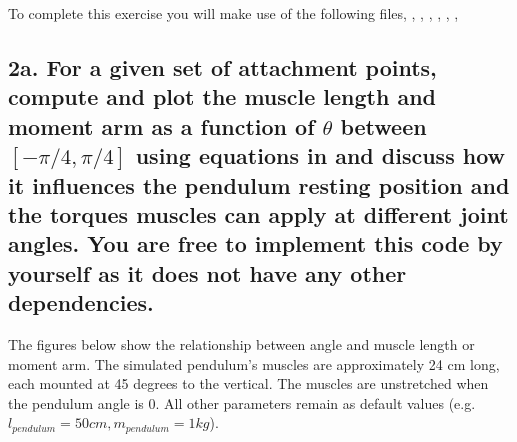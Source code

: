 \documentclass{cmc}
\begin{document}
To complete this exercise you will make use of the following files,
, ,
, , ,
,  %

\label{sec:questions}

\subsection*{2a. For a given set of attachment points, compute and
  plot the muscle length and moment arm as a function of $\theta$
  between $[-\pi/4, \pi/4]$ using equations in 
  and discuss how it influences the pendulum resting position and the
  torques muscles can apply at different joint angles. You are free to implement
this code by yourself as it does not have any other dependencies.}
\label{sec:2a}

The figures below show the relationship between angle and muscle length or moment arm. The simulated pendulum's muscles are approximately 24 cm long, each mounted at 45 degrees to the vertical. The muscles are unstretched when the pendulum angle is 0. All other parameters remain as default values (e.g. $l_{pendulum}=50cm, m_{pendulum}=1kg$).
\end{document}
